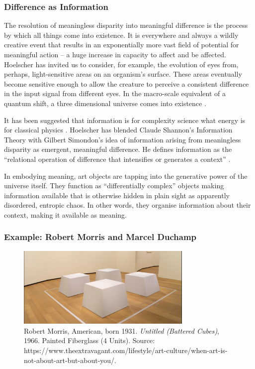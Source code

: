 \documentclass[letterpaper]{article}
\begin{document}
    \subsubsection{Difference as Information}

    The resolution of meaningless disparity into meaningful difference is the process by which all things come into existence. It is everywhere and always a wildly creative event that results in an exponentially more vast field of potential for meaningful action – a huge increase in capacity to affect and be affected. Hoelscher has invited us to consider, for example, the evolution of eyes from, perhaps, light-sensitive areas on an organism's surface. These areas eventually become sensitive enough to allow the creature to perceive a consistent difference in the input signal from different eyes. In the macro-scale equivalent of a quantum shift, a three dimensional universe comes into existence \citep[p.5]{HoelscherArtAsInfrmtn2021}.

    It has been suggested that information is for complexity science what energy is for classical physics \citep[0:52]{CrutchfieldIntrdctnToCmplxty2018} \citep{CrutfieldRtAlSgntrsOfInfnty2015}. Hoelscher has blended Claude Shannon's Information Theory with Gilbert Simondon's idea of information arising from meaningless disparity as emergent, meaningful difference. He defines information as the “relational operation of difference that intensifies or generates a context” \citep[p.6]{HoelscherArtAsInfrmtn2021}.
    
    In embodying meaning, art objects are tapping into the generative power of the universe itself. They function as “differentially complex” \citep[p.74]{HoelscherArtAsInfrmtn2021} objects making information available that is otherwise hidden in plain sight as apparently disordered, entropic chaos. In other words, they organise information about their context, making it available as meaning.

    \subsubsection{Example: Robert Morris and Marcel Duchamp}

    \begin{figure}[h]
    \includegraphics[width=3.31in]{robert-morris-cubes.png}
    \caption{Robert Morris, American, born 1931. \emph{Untitled (Battered Cubes)}, 1966. Painted Fiberglass (4 Units). Source: https://www.theextravagant.com/lifestyle/art-culture/when-art-is-not-about-art-but-about-you/.}
    \end{figure}
\end{document}
